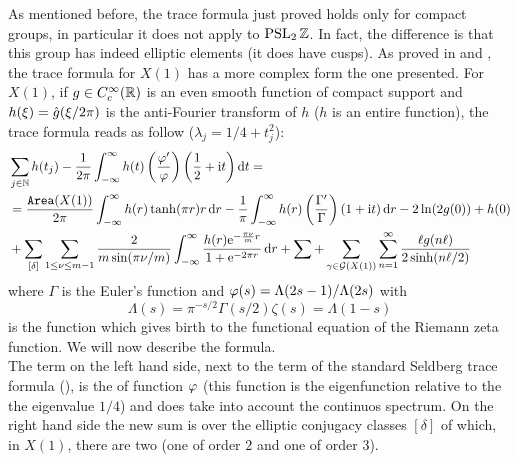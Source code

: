 As mentioned before, the trace formula just proved holds only for compact groups, in particular it does not apply to $\operatorname{PSL}_{2}\mathbb{Z}$. In fact, the difference is that this group has indeed elliptic elements (it does have cusps). As proved in \cite{Sarnak:article} and \cite{Gutz:book}, the trace formula for $X(1)$ has a more complex form the one presented. For $X(1)$, if $g\in C_{c}^{\infty}(\mathbb{R})$ is an even smooth function of compact support and $h(\xi)=\hat{g}(\xi/2\pi)$ is the anti-Fourier transform of $h$ ($h$ is an entire function), the trace formula reads as follow ($\lambda_{j}=1/4+t^{2}_{j}$):
\begin{align}
\label{eq:trace_formula_extended}
&\sum_{j\in\mathbb{N}}h(t_{j})-\frac{1}{2\pi}\int_{-\infty}^{\infty}h(t)\left(\frac{\varphi'}{\varphi}\right)\left(\frac{1}{2}+\mathrm{i} t\right)\mathop{}\!\mathrm{d} t=\\
&= \frac{\operatorname{\mathtt{Area}}(X(1))}{2\pi}\int_{-\infty}^{\infty}h(r)\tanh(\pi r)r\mathop{}\!\mathrm{d} r-\frac{1}{\pi}\int_{-\infty}^{\infty}h(r)\left(\frac{\Gamma'}{\Gamma}\right)\left(1+\mathrm{i} t\right)\mathop{}\!\mathrm{d} r-2\ln(2g(0))+h(0)  \nonumber\\
&+\sum_{[\delta]}\sum_{1\leq\nu\leq m-1}\frac{2}{m\sin(\pi\nu/m)}\int_{-\infty}^{\infty}\frac{h(r)\mathrm{e}^{-\frac{\pi\nu}{m}r}}{1+\mathrm{e}^{-2\pi r}}\mathop{}\!\mathrm{d} r+\sum_{}+\sum_{\gamma\in\mathcal{G}\left(X(1)\right)}\sum_{n=1}^{\infty}\frac{\ell g(n\ell)}{2\sinh(n\ell/2)} \nonumber
\end{align}
where $\Gamma$ is the Euler's function and $\varphi(s)=\Lambda(2s-1)/\Lambda(2s)$ with
\[
\Lambda(s)=\pi^{-s/2}\Gamma(s/2)\zeta(s)=\Lambda(1-s)
\]
is the function which gives birth to the functional equation of the Riemann zeta function. We will now describe the formula.\\
The term on the left hand side, next to the term of the standard Seldberg trace formula (\cite{Gutz:book}), is the  of function $\varphi$ (this function is the eigenfunction relative to the the eigenvalue $1/4$) and does take into account the continuos spectrum. On the right hand side the new sum is over the elliptic conjugacy classes $[\delta]$ of which, in $X(1)$, there are two (one of order $2$ and one of order $3$).\\

